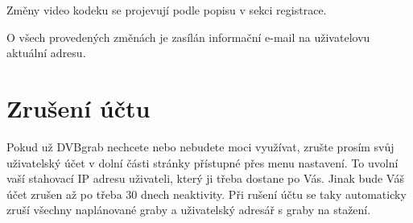 Změny video kodeku se projevují podle popisu v sekci registrace.

O všech provedených změnách je zasílán informační e-mail na uživatelovu aktuální adresu.

\section{Zrušení účtu}
Pokud už DVBgrab nechcete nebo nebudete moci využívat, zrušte prosím svůj uživatelský účet v dolní části stránky přístupné přes menu nastavení. To uvolní vaší stahovací IP adresu uživateli, který ji třeba dostane po Vás. Jinak bude Váš účet zrušen až po třeba 30 dnech neaktivity. Při rušení účtu se taky automaticky zruší všechny naplánované graby a uživatelský adresář s graby na stažení.
\vfil
